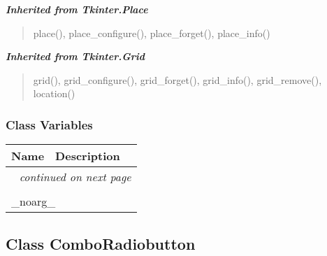 \large{\textbf{\textit{Inherited from Tkinter.Place}}}

\begin{quote}
place(), place\_configure(), place\_forget(), place\_info()
\end{quote}

\large{\textbf{\textit{Inherited from Tkinter.Grid}}}

\begin{quote}
grid(), grid\_configure(), grid\_forget(), grid\_info(), grid\_remove(), location()
\end{quote}


  \subsubsection{Class Variables}

    \vspace{-1cm}
\hspace{\varindent}\begin{longtable}{|p{\varnamewidth}|p{\vardescrwidth}|l}
\cline{1-2}
\cline{1-2} \centering \textbf{Name} & \centering \textbf{Description}& \\
\cline{1-2}
\endhead\cline{1-2}\multicolumn{3}{r}{\small\textit{continued on next page}}\\\endfoot\cline{1-2}
\endlastfoot\multicolumn{2}{|l|}{\textit{Inherited from Tkinter.Misc}}\\
\multicolumn{2}{|p{\varwidth}|}{\raggedright \_noarg\_}\\
\cline{1-2}
\end{longtable}



\subsection{Class ComboRadiobutton}

